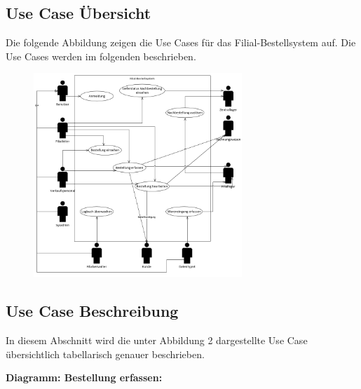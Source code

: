 \subsection{Use Case Übersicht}
Die folgende Abbildung zeigen die Use Cases für das Filial-Bestellsystem auf. Die Use Cases werden im folgenden beschrieben.

\begin{figure}[H]%
\centering
\includegraphics[width=0.7\textwidth]{Images/usecase-U.png}
\label{fig:usecase}
\end{figure}

\clearpage
\subsection{Use Case Beschreibung}
In diesem Abschnitt wird die unter Abbildung 2 dargestellte Use Case übersichtlich tabellarisch genauer beschrieben.






\newpage
\textbf{Diagramm: Bestellung erfassen:}

